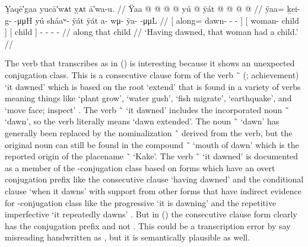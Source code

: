 
\ex\label{ex:94-11-dawn-woman-have-child}%
%
\begingl
	\glpreamble	Ỵaqē′gaa yucā′wᴀt ỵᴀt ā′wa-u. //
	\gla	{} Ÿaa  @ {} @ {} @ {} @ {} {}
		{} yú  @ {} {}
		{} ÿát {} 
		 @ {} @ {} @ {} @ {} //
	\glb	{} ÿaa= ḵei- g-  -μμH {} {}
		{} yú sháaʷ- ÿát {}
		{} ÿát {}
		a- wμ- ÿa-  -μμL //
	\glc	{}[ along= dawn- -  - \· {}]
		{}[  woman- child {}]
		{}[ child {}]
		- - -  - //
	\gld	{} along  {} {} {} {} {}
		{} that  {} {}
		{} child {}
		 {} {} {} {} //
	\glft	‘Having dawned, that woman had a child.’
		//
\endgl
\xe

The verb that \citeauthor{swanton:1909} transcribes as  in (\lastx) is interesting because it shows an unexpected conjugation class.
This is a consecutive clause form of the verb  \~\  (; achievement) ‘it dawned’ which is based on the root  ‘extend’ that is found in a variety of verbs meaning things like ‘plant grow’, ‘water gush’, ‘fish migrate’, ‘earthquake’, and ‘move face; inspect’ \parencite[72–78]{leer:1976}.
The verb  \~\  ‘it dawned’ includes the incorporated noun  \~\  ‘dawn’, so the verb literally means ‘dawn extended’.
The noun  \~\  ‘dawn’ has generally been replaced by the nominalization  \~\  derived from the verb, but the original noun can still be found in the compound  \~\  ‘mouth of dawn’ which is the reported origin of the placename  \~\  ‘Kake’.
The verb  \~\  ‘it dawned’ is documented as a member of the -conjugation class based on forms which have an overt  conjugation prefix like the consecutive clause  ‘having dawned’ and the conditional clause  ‘when it dawns’ \parencite[02/10]{leer:1973} with support from other forms that have indirect evidence for -conjugation class like the progressive  ‘it is dawning’ and the repetitive imperfective  ‘it repeatedly dawns’ \parencite[3]{leer:1963}.
But in (\lastx) the consecutive clause form  clearly has the  conjugation prefix and not .
This could be a transcription error by say misreading handwritten  as , but it is semantically plausible as well.

